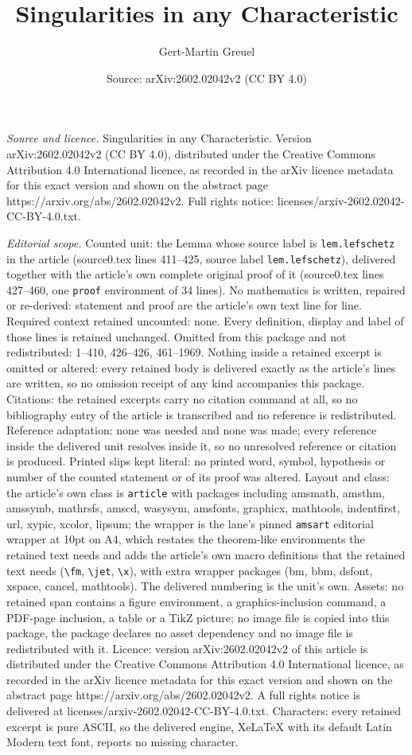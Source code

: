 \documentclass[10pt,a4paper]{amsart}
\title[Singularities in any Characteristic]{Singularities in any Characteristic}
\author{Gert-Martin Greuel}
\date{Source: arXiv:2602.02042v2 (CC BY 4.0)}
\begin{document}
\maketitle

\noindent\emph{Source and licence.} Singularities in any Characteristic. Version arXiv:2602.02042v2 (CC BY 4.0), distributed under the Creative Commons Attribution 4.0 International licence, as recorded in the arXiv licence metadata for this exact version and shown on the abstract page https://arxiv.org/abs/2602.02042v2. Full rights notice: licenses/arxiv-2602.02042-CC-BY-4.0.txt.\par\smallskip

\noindent\textit{Editorial scope.} Counted unit: the Lemma whose source label is \texttt{lem.lefschetz} in the article (source0.tex lines 411--425, source label \texttt{lem.lefschetz}), delivered together with the article's own complete original proof of it (source0.tex lines 427--460, one \texttt{proof} environment of 34 lines). No mathematics is written, repaired or re-derived: statement and proof are the article's own text line for line. Required context retained uncounted: none. Every definition, display and label of those lines is retained unchanged. Omitted from this package and not redistributed: 1--410, 426--426, 461--1969. Nothing inside a retained excerpt is omitted or altered: every retained body is delivered exactly as the article's lines are written, so no omission receipt of any kind accompanies this package. Citations: the retained excerpts carry no citation command at all, so no bibliography entry of the article is transcribed and no reference is redistributed. Reference adaptation: none was needed and none was made; every reference inside the delivered unit resolves inside it, so no unresolved reference or citation is produced. Printed slips kept literal: no printed word, symbol, hypothesis or number of the counted statement or of its proof was altered. Layout and class: the article's own class is \texttt{article} with packages including amsmath, amsthm, amssymb, mathrsfs, amscd, wasysym, amsfonts, graphicx, mathtools, indentfirst, url, xypic, xcolor, lipsum; the wrapper is the lane's pinned \texttt{amsart} editorial wrapper at 10pt on A4, which restates the theorem-like environments the retained text needs and adds the article's own macro definitions that the retained text needs (\texttt{\textbackslash fm}, \texttt{\textbackslash jet}, \texttt{\textbackslash x}), with extra wrapper packages (bm, bbm, dsfont, xspace, cancel, mathtools). The delivered numbering is the unit's own. Assets: no retained span contains a figure environment, a graphics-inclusion command, a PDF-page inclusion, a table or a TikZ picture; no image file is copied into this package, the package declares no asset dependency and no image file is redistributed with it. Licence: version arXiv:2602.02042v2 of this article is distributed under the Creative Commons Attribution 4.0 International licence, as recorded in the arXiv licence metadata for this exact version and shown on the abstract page https://arxiv.org/abs/2602.02042v2. A full rights notice is delivered at licenses/arxiv-2602.02042-CC-BY-4.0.txt. Characters: every retained excerpt is pure ASCII, so the delivered engine, XeLaTeX with its default Latin Modern text font, reports no missing character.
\end{document}
